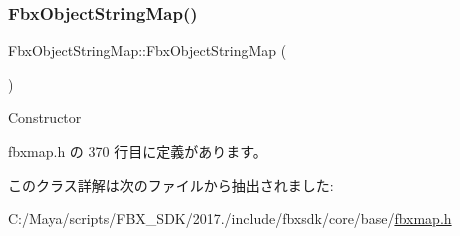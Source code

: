 \subsubsection{\texorpdfstring{Fbx\+Object\+String\+Map()}{FbxObjectStringMap()}}
{\footnotesize\ttfamily Fbx\+Object\+String\+Map\+::\+Fbx\+Object\+String\+Map (\begin{DoxyParamCaption}{ }\end{DoxyParamCaption})\hspace{0.3cm}{\ttfamily [inline]}}



Constructor 



 fbxmap.\+h の 370 行目に定義があります。



このクラス詳解は次のファイルから抽出されました\+:\begin{DoxyCompactItemize}
\item 
C\+:/\+Maya/scripts/\+F\+B\+X\+\_\+\+S\+D\+K/2017./include/fbxsdk/core/base/\hyperlink{fbxmap_8h}{fbxmap.\+h}\end{DoxyCompactItemize}
